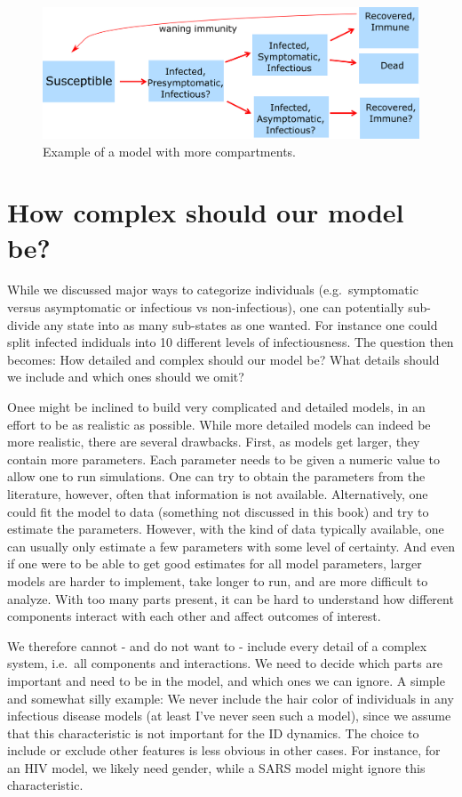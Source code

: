 \documentclass[]{book}
\theoremstyle{definition}
\theoremstyle{definition}
\theoremstyle{definition}
\theoremstyle{remark}
\begin{document}
\begin{figure}
\centering
\includegraphics{./images/ComplicatedModel.png}
\caption{\label{fig:complicatedmodel}Example of a model with more
compartments.}
\end{figure}

\section{How complex should our model
be?}\label{how-complex-should-our-model-be}

While we discussed major ways to categorize individuals
(e.g.~symptomatic versus asymptomatic or infectious vs non-infectious),
one can potentially sub-divide any state into as many sub-states as one
wanted. For instance one could split infected indiduals into 10
different levels of infectiousness. The question then becomes: How
detailed and complex should our model be? What details should we include
and which ones should we omit?

Onee might be inclined to build very complicated and detailed models, in
an effort to be as realistic as possible. While more detailed models can
indeed be more realistic, there are several drawbacks. First, as models
get larger, they contain more parameters. Each parameter needs to be
given a numeric value to allow one to run simulations. One can try to
obtain the parameters from the literature, however, often that
information is not available. Alternatively, one could fit the model to
data (something not discussed in this book) and try to estimate the
parameters. However, with the kind of data typically available, one can
usually only estimate a few parameters with some level of certainty. And
even if one were to be able to get good estimates for all model
parameters, larger models are harder to implement, take longer to run,
and are more difficult to analyze. With too many parts present, it can
be hard to understand how different components interact with each other
and affect outcomes of interest.

We therefore cannot - and do not want to - include every detail of a
complex system, i.e.~all components and interactions. We need to decide
which parts are important and need to be in the model, and which ones we
can ignore. A simple and somewhat silly example: We never include the
hair color of individuals in any infectious disease models (at least
I've never seen such a model), since we assume that this characteristic
is not important for the ID dynamics. The choice to include or exclude
other features is less obvious in other cases. For instance, for an HIV
model, we likely need gender, while a SARS model might ignore this
characteristic.
\end{document}

